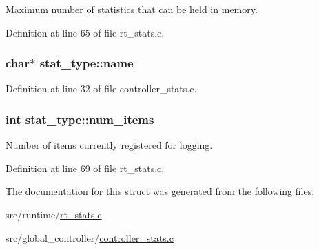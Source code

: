 Maximum number of statistics that can be held in memory. 



Definition at line 65 of file rt\-\_\-stats.\-c.

\hypertarget{structstat__type_ae4e7f67c4950bcfbe35ba672bcfd6923}{
\subsubsection[{name}]{\setlength{\rightskip}{0pt plus 5cm}char$\ast$ stat\-\_\-type\-::name}}\label{structstat__type_ae4e7f67c4950bcfbe35ba672bcfd6923}


Definition at line 32 of file controller\-\_\-stats.\-c.

\hypertarget{structstat__type_a58e7d3ee8ef48ab267367fc3266a9113}{
\subsubsection[{num\-\_\-items}]{\setlength{\rightskip}{0pt plus 5cm}int stat\-\_\-type\-::num\-\_\-items}}\label{structstat__type_a58e7d3ee8ef48ab267367fc3266a9113}


Number of items currently registered for logging. 



Definition at line 69 of file rt\-\_\-stats.\-c.



The documentation for this struct was generated from the following files\-:\begin{DoxyCompactItemize}
\item 
src/runtime/\hyperlink{rt__stats_8c}{rt\-\_\-stats.\-c}\item 
src/global\-\_\-controller/\hyperlink{controller__stats_8c}{controller\-\_\-stats.\-c}\end{DoxyCompactItemize}
